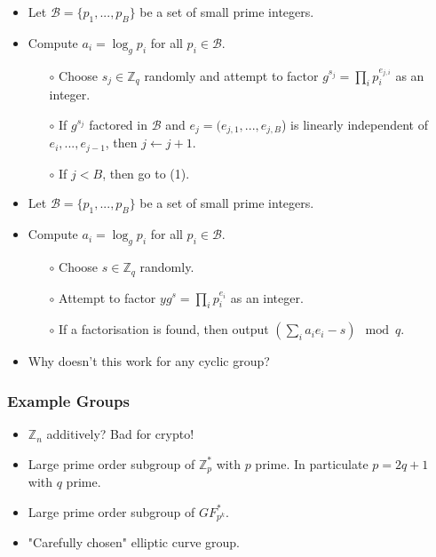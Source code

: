 \documentclass[a4paper]{scrartcl}
\begin{document}
\begin{itemize}
\item Let $\mathcal{B} = \{p_1, ..., p_B\}$ be a set of small prime integers.
\item Compute $a_i = \log_g p_i$ for all $p_i \in \mathcal{B}$.
\begin{itemize}
\item [$\circ$] Choose $s_j \in \mathbb{Z}_q$ randomly and attempt to factor $g^{s_j} = \prod_i p_i^{e_{j,i}}$ as an integer.
\item [$\circ$] If $g^{s_j}$ factored in $\mathcal{B}$ and $e_j = (e_{j,1}, ..., e_{j,B}$) is linearly independent of $e_i, ..., e_{j-1}$, then $j \gets j + 1$.
\item [$\circ$] If $j < B$, then go to (1).
\end{itemize}

\item Let $\mathcal{B} = \{p_1, ..., p_B\}$ be a set of small prime integers.
\item Compute $a_i = \log_g p_i$ for all $p_i \in \mathcal{B}$.
\begin{itemize}
\item [$\circ$] Choose $s \in \mathbb{Z}_q$ randomly.
\item [$\circ$] Attempt to factor $yg^s = \prod_i p_i^{e_i}$ as an integer.
\item [$\circ$] If a factorisation is found, then output $(\sum_i a_ie_i-s) \mod q$. 
\end{itemize}
\item Why doesn't this work for any cyclic group?
\end{itemize}

\subsubsection*{Example Groups}

\begin{itemize}
\item $\mathbb{Z}_n$ additively? Bad for crypto!
\item Large prime order subgroup of $\mathbb{Z}_p^*$ with $p$ prime. In particulate $p = 2q+1$ with $q$ prime.
\item Large prime order subgroup of $GF_{p^k}^*$.
\item "Carefully chosen" elliptic curve group.
\end{itemize}
\end{document}

